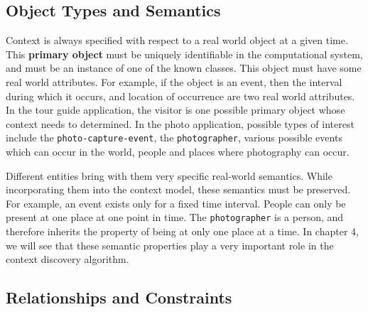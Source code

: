 
\subsection{Object Types and Semantics}
Context is always specified with respect to a real world object at a given time. This \textbf{primary object} must be uniquely identifiable in the computational system, and must be an instance of one of the known classes. This object must have some real world attributes. For example, if the object is an event, then the interval during which it occurs, and location of occurrence are two real world attributes. In the tour guide application, the visitor is one possible primary object whose context needs to determined. In the photo application, possible types of interest include the \texttt{photo-capture-event}, the \texttt{photographer}, various possible events which can occur in the world, people and places where photography can occur.

Different entities bring with them very specific real-world semantics. While incorporating them into the context model, these semantics must be preserved. For example, an event exists only for a fixed time interval. People can only be present at one place at one point in time. The \texttt{photographer} is a person, and therefore inherits the property of being at only one place at a time. In chapter 4, we will see that these semantic properties play a very important role in the context discovery algorithm.

\subsection{Relationships and Constraints}



